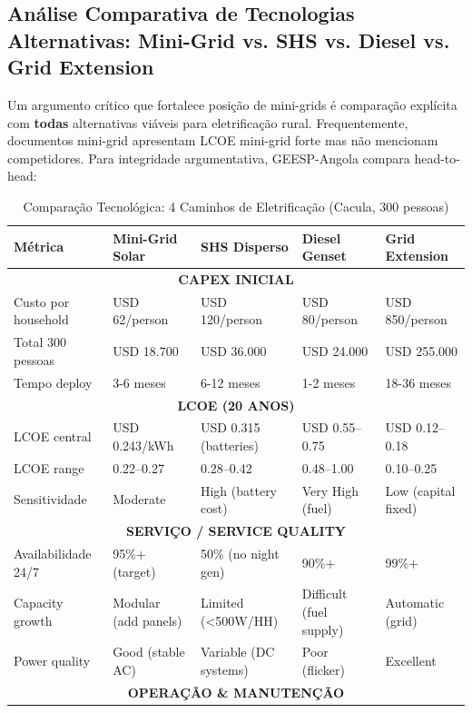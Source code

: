 \documentclass[12pt, a4paper]{article}
\begin{document}
{{{{{{{{{{{{\subsection{Análise Comparativa de Tecnologias Alternativas: Mini-Grid vs. SHS vs. Diesel vs. Grid Extension}

Um argumento crítico que fortalece posição de mini-grids é comparação explícita com \textbf{todas} alternativas viáveis para eletrificação rural. Frequentemente, documentos mini-grid apresentam LCOE mini-grid forte mas não mencionam competidores. Para integridade argumentativa, GEESP-Angola compara head-to-head:

\begin{table}[H]
\centering
\caption{Comparação Tecnológica: 4 Caminhos de Eletrificação (Cacula, 300 pessoas)}
\label{tab:tech_comparison}
\small
\begin{tabular}{|l|l|l|l|l|}
\hline
\textbf{Métrica} & \textbf{Mini-Grid Solar} & \textbf{SHS Disperso} & \textbf{Diesel Genset} & \textbf{Grid Extension} \\
\hline
\multicolumn{5}{|c|}{\textbf{CAPEX INICIAL}} \\
\hline
Custo por household & USD 62/person & USD 120/person & USD 80/person & USD 850/person \\
Total 300 pessoas & USD 18.700 & USD 36.000 & USD 24.000 & USD 255.000 \\
Tempo deploy & 3-6 meses & 6-12 meses & 1-2 meses & 18-36 meses \\
\hline
\multicolumn{5}{|c|}{\textbf{LCOE (20 ANOS)}} \\
\hline
LCOE central & USD 0.243/kWh & USD 0.315 (batteries) & USD 0.55–0.75 & USD 0.12–0.18 \\
LCOE range & 0.22–0.27 & 0.28–0.42 & 0.48–1.00 & 0.10–0.25 \\
Sensitividade & Moderate & High (battery cost) & Very High (fuel) & Low (capital fixed) \\
\hline
\multicolumn{5}{|c|}{\textbf{SERVIÇO / SERVICE QUALITY}} \\
\hline
Availabilidade 24/7 & 95\%+ (target) & 50\% (no night gen) & 90\%+ & 99\%+ \\
Capacity growth & Modular (add panels) & Limited (<500W/HH) & Difficult (fuel supply) & Automatic (grid) \\
Power quality & Good (stable AC) & Variable (DC systems) & Poor (flicker) & Excellent \\
\hline
\multicolumn{5}{|c|}{\textbf{OPERAÇÃO \& MANUTENÇÃO}} \\

\end{tabular}
\end{table}}}}}}}}}}}}}
\end{document}
